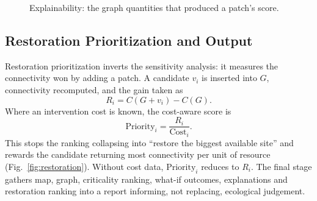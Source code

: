 \documentclass[conference]{IEEEtran}
\begin{document}
\begin{figure}[!tbp]
\centering
{}
\caption{Explainability: the graph quantities that produced a patch's score.}
\label{fig:xai}
\end{figure}

\subsection{Restoration Prioritization and Output}

Restoration prioritization inverts the sensitivity analysis: it measures the connectivity won by adding a patch. A candidate $v_i$ is inserted into $G$, connectivity recomputed, and the gain taken as
\begin{equation}
R_i = C(G + v_i) - C(G).
\label{eq:gain}
\end{equation}
Where an intervention cost is known, the cost-aware score is
\begin{equation}
\text{Priority}_i = \frac{R_i}{\text{Cost}_i}.
\label{eq:priority}
\end{equation}
This stops the ranking collapsing into ``restore the biggest available site'' and rewards the candidate returning most connectivity per unit of resource (Fig.~\ref{fig:restoration}). Without cost data, $\text{Priority}_i$ reduces to $R_i$. The final stage gathers map, graph, criticality ranking, what-if outcomes, explanations and restoration ranking into a report informing, not replacing, ecological judgement.
\end{document}
